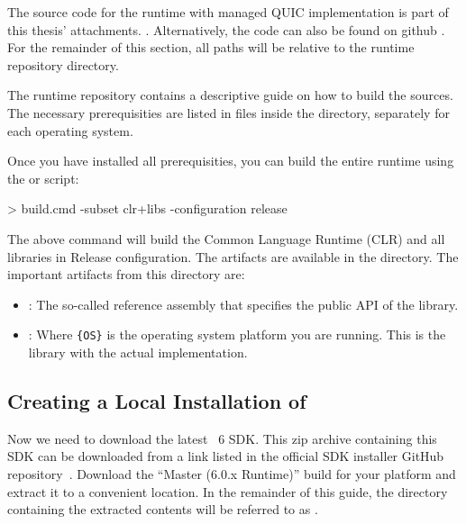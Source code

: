 The source code for the \dotnet{} runtime with managed QUIC implementation is part of this thesis'
attachments. . Alternatively, the code can
also be found on github . For the remainder of this section, all paths will be relative
to the \dotnet{} runtime repository directory.

The \dotnet{} runtime repository contains a descriptive guide on how to build the sources. The
necessary prerequisities are listed in files inside the 
directory, separately for each operating system.

Once you have installed all prerequisities, you can build the entire \dotnet{} runtime using the
 or  script:

\begin{myVerbatim}
> build.cmd -subset clr+libs -configuration release
\end{myVerbatim}

The above command will build the Common Language Runtime (CLR) and all libraries in Release
configuration. The artifacts are available in the 
directory. The important artifacts from this directory are:

\begin{itemize}

  \item {}: The so-called reference assembly that specifies the public API of the library.

  \item {}: Where \verb|{OS}| is the operating system platform you are running. This is the library with the actual implementation.

\end{itemize}

\subsection{Creating a Local Installation of \dotnet{}}\label{sec:06-local-dotnet}

Now we need to download the latest \dotnet{}~6 SDK. This zip archive containing this SDK can be
downloaded from a link listed in the official SDK installer GitHub
repository~\cite{dotnetSdkGithub}. Download the ``Master (6.0.x Runtime)'' build for your platform
and extract it to a convenient location. In the remainder of this guide, the directory containing
the extracted contents will be referred to as .

